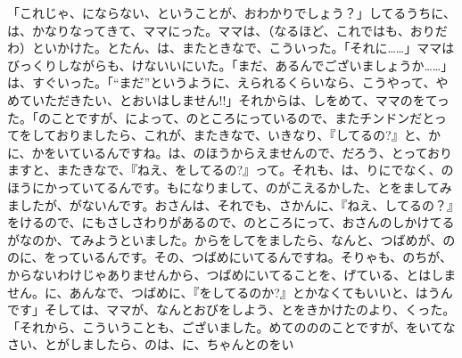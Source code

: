 「これじゃ、にならない、ということが、おわかりでしょう？」してるうちに、は、かなりなってきて、ママにった。ママは、（なるほど、これではも、おりだわ）といかけた。とたん、は、またときなで、こういった。「それに……」ママはびっくりしながらも、けないいにいた。「まだ、あるんでございましょうか……」は、すぐいった。「“まだ”というように、えられるくらいなら、こうやって、やめていただきたい、とおいはしません!!」それからは、しをめて、ママのをてった。「のことですが、によって、のところにっているので、またチンドンだとってをしておりましたら、これが、またきなで、いきなり、『してるの?』と、かに、かをいているんですね。は、のほうからえませんので、だろう、とっておりますと、またきなで、『ねえ、をしてるの?』って。それも、は、りにでなく、のほうにかっていてるんです。もになりまして、のがこえるかした、とをましてみましたが、がないんです。おさんは、それでも、さかんに、『ねえ、してるの？』をけるので、にもさしさわりがあるので、のところにって、おさんのしかけてるがなのか、てみようといました。からをしてをましたら、なんと、つばめが、ののに、をっているんです。その、つばめにいてるんですね。そりゃも、のちが、からないわけじゃありませんから、つばめにいてることを、げている、とはしません。に、あんなで、つばめに、『をしてるのか?』とかなくてもいいと、はうんです」そしては、ママが、なんとおびをしよう、とをきかけたのより、くった。「それから、こういうことも、ございました。めてのののことですが、をいてなさい、とがしましたら、のは、に、ちゃんとのをい
